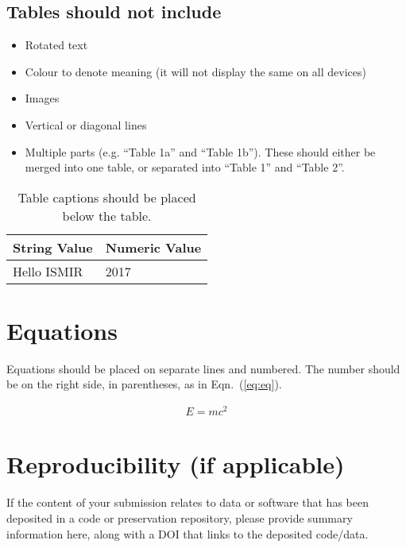 \documentclass{article}
\begin{document}
\subsection{Tables should not include}

\begin{itemize}
  \item Rotated text
  \item Colour to denote meaning (it will not display the same on all devices)
  \item Images
  \item Vertical or diagonal lines
  \item Multiple parts (e.g. ``Table 1a'' and ``Table 1b'').
  These should either be merged into one table,
  or separated into ``Table 1'' and ``Table 2''.
\end{itemize}

\begin{table}[htpb]
\centering
  \begin{tabular}{ll}
  \toprule
  \bfseries String Value & \bfseries Numeric Value \\ \midrule
  Hello ISMIR  & 2017          \\
  \bottomrule
  \end{tabular}
  \caption{Table captions should be placed below the table.}
\label{tab:table}
\end{table}

\section{Equations}\label{sec:equations}

Equations should be placed on separate lines and numbered.
The number should be on the right side, in parentheses,
as in Eqn.~(\ref{eq:eq}).

\begin{align}\label{eq:eq}
E = mc^2
\end{align}

\section{Reproducibility (if applicable)}

If the content of your submission relates to data or software
that has been deposited in a code or preservation repository,
please provide summary information here, along with a DOI that
links to the deposited code/data.
\end{document}
